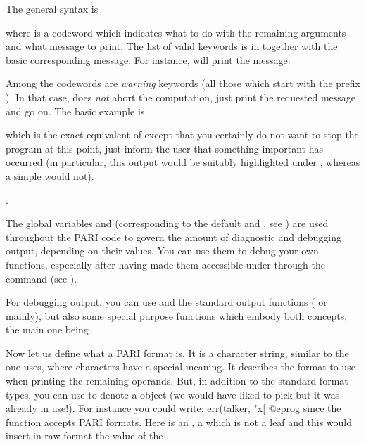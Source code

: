 \noindent
The general syntax is


\noindent where  is a codeword which indicates what to do with
the remaining arguments and what message to print. The list of valid keywords
is in  together with the basic corresponding
message. For instance,  will print the message:


\noindent
Among the codewords are \emph{warning} keywords (all those which start with
the prefix ). In that case,  does \emph{not} abort the
computation, just print the requested message and go on. The basic example is


\noindent which is the exact equivalent of  except that
you certainly do not want to stop the program at this point, just inform the
user that something important has occurred (in particular, this output would be
suitably highlighted under , whereas a simple  would not).

.\label{se:dbg_output}

\noindent
The global variables  and  (corresponding
to the default  and , see )
are used throughout the PARI code to govern the amount of diagnostic and
debugging output, depending on their values. You can use them to debug your
own functions, especially after having made them accessible under  through
the command  (see ).

For debugging output, you can use  and the standard output
functions ( or  mainly), but also some special purpose
functions which embody both concepts, the main one being


\noindent
Now let us define what a PARI format is. It is a character string, similar
to the one  uses, where \kbd{\%} characters have a special
meaning. It describes the format to use when printing the remaining operands.
But, in addition to the standard format types, you can use  to
denote a  object (we would have liked to pick  but it was
already in use!). For instance you could write:
\bprog
err(talker, "x[%
@eprog
\noindent since the  function accepts PARI formats. Here 
is an ,  a  which is not a leaf and this would
insert in raw format the value of the  .

